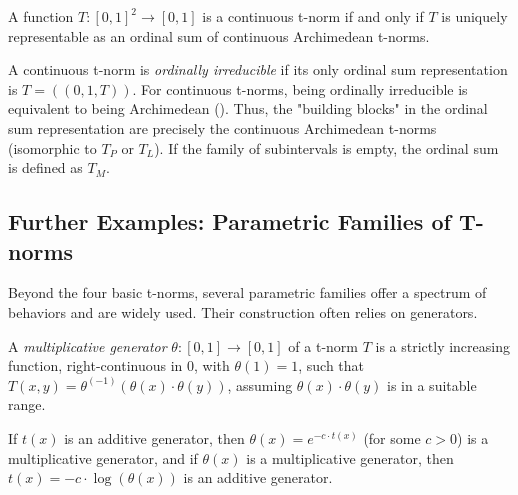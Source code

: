 \begin{theorem}
  A function $T: [0,1]^2 \to [0,1]$ is a continuous t-norm if and only if $T$ is uniquely representable as an ordinal sum of continuous Archimedean t-norms.
\end{theorem}
\begin{remark}
  A continuous t-norm is \emph{ordinally irreducible} if its only ordinal sum representation is $T = ((0,1,T))$. For continuous t-norms, being ordinally irreducible is equivalent to being Archimedean (\cite[Prop.~3.53, p.~99 and context]{Klement2000}). Thus, the "building blocks" in the ordinal sum representation are precisely the continuous Archimedean t-norms (isomorphic to $T_P$ or $T_L$). If the family of subintervals is empty, the ordinal sum is defined as $T_M$.
\end{remark}

\subsection{Further Examples: Parametric Families of T-norms}
Beyond the four basic t-norms, several parametric families offer a spectrum of behaviors and are widely used. Their construction often relies on generators.
\begin{definition}
  A \emph{multiplicative generator} $\theta: [0,1] \to [0,1]$ of a t-norm $T$ is a strictly increasing function, right-continuous in $0$, with $\theta(1)=1$, such that $T(x,y) = \theta^{(-1)}(\theta(x) \cdot \theta(y))$, assuming $\theta(x)\cdot\theta(y)$ is in a suitable range. 
\end{definition}
\begin{remark}
  If $t(x)$ is an additive generator, then $\theta(x) = e^{-c \cdot t(x)}$ (for some $c>0$) is a multiplicative generator, and if $\theta(x)$ is a multiplicative generator, then $t(x) = -c \cdot \log(\theta(x))$ is an additive generator.
\end{remark}

